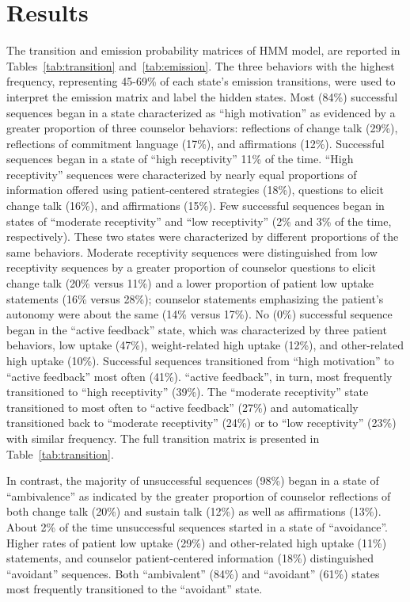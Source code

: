 \section{Results}
\label{sec:results}
The transition and emission probability matrices of HMM model, are reported in Tables~\ref{tab:transition} and~\ref{tab:emission}. The three behaviors with the highest frequency, representing 45-69\% of each state’s emission transitions, were used to interpret the emission matrix and label the hidden states. Most (84\%) successful sequences began in a state characterized as “high motivation” as evidenced by a greater proportion of three counselor behaviors: reflections of change talk (29\%), reflections of commitment language (17\%), and affirmations (12\%). Successful sequences began in a state of “high receptivity” 11\% of the time. “High receptivity” sequences were characterized by nearly equal proportions of information offered using patient-centered strategies (18\%), questions to elicit change talk (16\%), and affirmations (15\%). Few successful sequences began in states of “moderate receptivity” and “low receptivity” (2\% and 3\% of the time, respectively). These two states were characterized by different proportions of the same behaviors. Moderate receptivity sequences were distinguished from low receptivity sequences by a greater proportion of counselor questions to elicit change talk (20\% versus 11\%) and a lower proportion of patient low uptake statements (16\% versus 28\%); counselor statements emphasizing the patient’s autonomy were about the same (14\% versus 17\%). No (0\%) successful sequence began in the “active feedback” state, which was characterized by three patient behaviors, low uptake (47\%), weight-related high uptake (12\%), and other-related high uptake (10\%). Successful sequences transitioned from “high motivation” to “active feedback” most often (41\%). “active feedback”, in turn, most frequently transitioned to “high receptivity” (39\%). The “moderate receptivity” state transitioned to most often to “active feedback” (27\%) and automatically transitioned back to “moderate receptivity” (24\%) or to “low receptivity” (23\%) with similar frequency. The full transition matrix is presented in Table~\ref{tab:transition}.

In contrast, the majority of unsuccessful sequences (98\%) began in a state of “ambivalence” as indicated by the greater proportion of counselor reflections of both change talk (20\%) and sustain talk (12\%) as well as affirmations (13\%). About 2\% of the time unsuccessful sequences started in a state of “avoidance”. Higher rates of patient low uptake (29\%) and other-related high uptake (11\%) statements, and counselor patient-centered information (18\%) distinguished “avoidant” sequences. Both “ambivalent” (84\%) and “avoidant” (61\%) states most frequently transitioned to the “avoidant” state.

